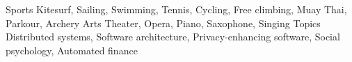 
\begin{cvskills}

\vspace{0.4cm}
\cvskill
{Sports}
{Kitesurf, Sailing, Swimming, Tennis, Cycling, Free climbing, Muay Thai, Parkour, Archery}
\vspace{0.4cm}
\cvskill
{Arts}
{Theater, Opera, Piano, Saxophone, Singing}
\vspace{0.4cm}
\cvskill
{Topics}
{Distributed systems, Software architecture, Privacy-enhancing software, Social psychology, Automated finance}
\end{cvskills}
